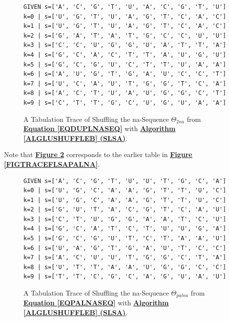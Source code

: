 \documentclass[a4paper, 18pt]{book} %
\begin{document}
\begin{figure}[H]
  \begin{center}
\Large
\begin{verbatim}
GIVEN s=['A', 'C', 'G', 'T', 'U', 'A', 'C', 'G', 'T', 'U']
k=0 | s=['U', 'G', 'T', 'U', 'A', 'G', 'T', 'C', 'A', 'C']
k=1 | s=['U', 'G', 'T', 'U', 'A', 'G', 'T', 'C', 'A', 'C']
k=2 | s=['G', 'A', 'T', 'A', 'T', 'G', 'C', 'C', 'U', 'U']
k=3 | s=['C', 'C', 'U', 'G', 'G', 'U', 'A', 'T', 'T', 'A']
k=4 | s=['G', 'C', 'A', 'C', 'T', 'T', 'A', 'U', 'G', 'U']
k=5 | s=['G', 'C', 'G', 'U', 'C', 'T', 'T', 'U', 'A', 'A']
k=6 | s=['A', 'U', 'G', 'T', 'G', 'A', 'U', 'C', 'C', 'T']
k=7 | s=['U', 'C', 'A', 'U', 'T', 'G', 'G', 'T', 'C', 'A']
k=8 | s=['A', 'C', 'T', 'U', 'A', 'U', 'G', 'G', 'C', 'T']
k=9 | s=['C', 'T', 'T', 'G', 'C', 'U', 'G', 'U', 'A', 'A']
\end{verbatim}

   \caption{A Tabulation Trace of Shuffling the na-Sequence $\Theta_{2na}$ from \textbf{\hyperref[EQDUPLNASEQ]{Equation \ref{EQDUPLNASEQ}}} with \textbf{\hyperref[ALGLUSHUFFLEB]{Algorithm \ref{ALGLUSHUFFLEB} (SLSA)}}.}
  \label{FIGTRACESLSA2NA}
  \end{center}
\end{figure}


Note that \textbf{\hyperref[FIGTRACESLSAPALNA]{Figure \ref{FIGTRACESLSAPALNA}}} corresponds to the earlier table in \textbf{\hyperref[FIGTRACEFLSAPALNA]{Figure \ref{FIGTRACEFLSAPALNA}}}.



\begin{figure}[H]
  \begin{center}
\Large
\begin{verbatim}
GIVEN s=['A', 'C', 'G', 'T', 'U', 'U', 'T', 'G', 'C', 'A']
k=0 | s=['U', 'G', 'C', 'A', 'A', 'G', 'T', 'T', 'U', 'C']
k=1 | s=['U', 'G', 'C', 'A', 'A', 'G', 'T', 'T', 'U', 'C']
k=2 | s=['G', 'U', 'T', 'A', 'C', 'G', 'T', 'C', 'A', 'U']
k=3 | s=['C', 'T', 'U', 'G', 'G', 'A', 'A', 'T', 'C', 'U']
k=4 | s=['G', 'C', 'A', 'T', 'C', 'T', 'U', 'U', 'G', 'A']
k=5 | s=['G', 'C', 'G', 'U', 'T', 'C', 'T', 'A', 'A', 'U']
k=6 | s=['U', 'A', 'G', 'T', 'G', 'A', 'U', 'T', 'C', 'C']
k=7 | s=['A', 'C', 'U', 'U', 'T', 'G', 'G', 'C', 'T', 'A']
k=8 | s=['U', 'T', 'T', 'A', 'A', 'U', 'G', 'G', 'C', 'C']
k=9 | s=['T', 'T', 'C', 'G', 'C', 'A', 'G', 'U', 'A', 'U']
\end{verbatim}

   \caption{A Tabulation Trace of Shuffling the na-Sequence $\Theta_{palna}$ from \textbf{\hyperref[EQPALNASEQ]{Equation \ref{EQPALNASEQ}}} with \textbf{\hyperref[ALGLUSHUFFLEB]{Algorithm \ref{ALGLUSHUFFLEB} (SLSA)}}.}
  \label{FIGTRACESLSAPALNA}
  \end{center}
\end{figure}
\end{document}
